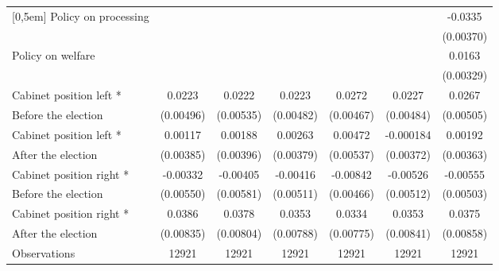 \begin{table}[!ht]
\begin{tabular}{l*{6}{c}}
[0,5em]
Policy on processing&                     &                     &                     &                     &                     &     -0.0335\sym{***}\\
                    &                     &                     &                     &                     &                     &   (0.00370)         \\
[0,5em]
Policy on welfare   &                     &                     &                     &                     &                     &      0.0163\sym{***}\\
                    &                     &                     &                     &                     &                     &   (0.00329)         \\
[0,5em]
Cabinet position left * &      0.0223\sym{***}&      0.0222\sym{***}&      0.0223\sym{***}&      0.0272\sym{***}&      0.0227\sym{***}&      0.0267\sym{***}\\
Before the election                    &   (0.00496)         &   (0.00535)         &   (0.00482)         &   (0.00467)         &   (0.00484)         &   (0.00505)         \\
[0,5em]
Cabinet position left * &     0.00117         &     0.00188         &     0.00263         &     0.00472         &   -0.000184         &     0.00192         \\
After the election                    &   (0.00385)         &   (0.00396)         &   (0.00379)         &   (0.00537)         &   (0.00372)         &   (0.00363)         \\
[0,5em]
Cabinet position right *&    -0.00332         &    -0.00405         &    -0.00416         &    -0.00842         &    -0.00526         &    -0.00555         \\
 Before the election                    &   (0.00550)         &   (0.00581)         &   (0.00511)         &   (0.00466)         &   (0.00512)         &   (0.00503)         \\
[0,5em]
Cabinet position right *&      0.0386\sym{***}&      0.0378\sym{***}&      0.0353\sym{***}&      0.0334\sym{***}&      0.0353\sym{***}&      0.0375\sym{***}\\
 After the election                    &   (0.00835)         &   (0.00804)         &   (0.00788)         &   (0.00775)         &   (0.00841)         &   (0.00858)         \\
\hline
Observations        &       12921         &       12921         &       12921         &       12921         &       12921         &       12921         \\

\end{tabular}
\end{table}

